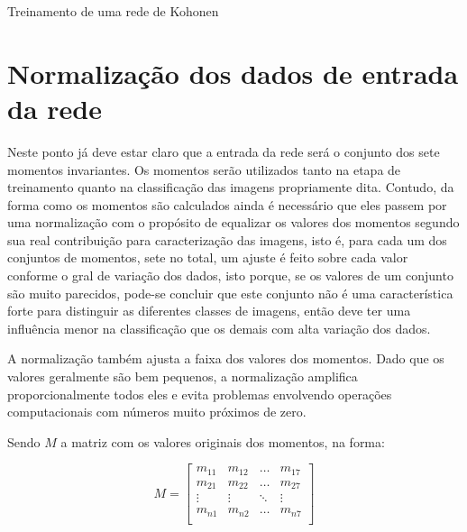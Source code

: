 \begin{algorithm}[H]
\caption{Treinamento de uma rede de Kohonen}\label{alg:trei_khn}
\end{algorithm}

\section{Normalização dos dados de entrada da rede}\label{sec:entrada_rede}

Neste ponto já deve estar claro que a entrada da rede será o conjunto dos sete
momentos invariantes. Os momentos serão utilizados tanto na etapa de treinamento
quanto na classificação das imagens propriamente dita. Contudo, da forma como os
momentos são calculados ainda é necessário que eles passem por uma normalização
com o propósito de equalizar os valores dos momentos segundo sua real
contribuição para caracterização das imagens, isto é, para cada um dos conjuntos
de momentos, sete no total, um ajuste é feito sobre cada valor conforme o gral de
variação dos dados, isto porque, se os valores de um conjunto são muito
parecidos, pode-se concluir que este conjunto não é uma característica forte
para distinguir as diferentes classes de imagens, então deve ter uma influência
menor na classificação que os demais com alta variação dos dados.

A normalização também ajusta a faixa dos valores dos momentos. Dado que os
valores geralmente são bem pequenos, a normalização amplifica proporcionalmente
todos eles e evita problemas envolvendo operações computacionais com números
muito próximos de zero.

Sendo $ M $ a matriz com os valores originais dos momentos, na forma:

\begin{equation}\label{eq:momentos_matriz}
  M = \left[
    \begin{array}{cccc}
        m_{11} & m_{12} & \hdots & m_{17} \\
        m_{21} & m_{22} & \hdots & m_{27} \\
        \vdots & \vdots & \ddots & \vdots \\
        m_{n1} & m_{n2} & \hdots & m_{n7} \\
    \end{array}
  \right]
\end{equation}


